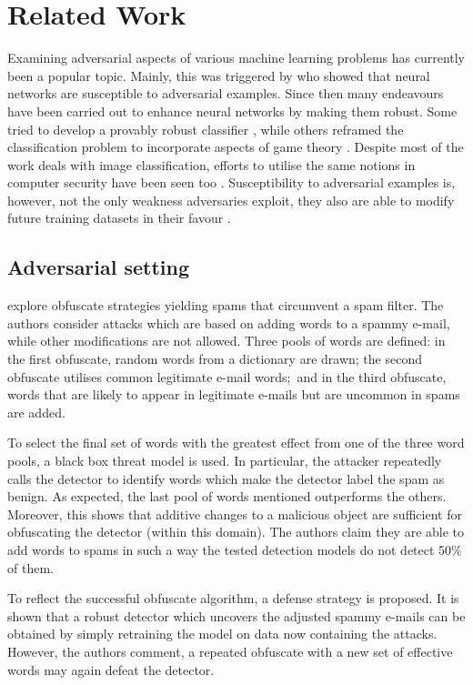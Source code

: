 \section{Related Work}

Examining adversarial aspects of various machine learning problems has
currently been a popular topic. Mainly, this was triggered by
\cite{adversarial_examples} who showed that neural networks are susceptible to
adversarial examples. Since then many endeavours have been carried out
to enhance neural networks by making them robust. Some tried to develop
a provably robust classifier \cite{provable_defenses}, while others reframed the
classification problem to incorporate aspects of game theory
\cite{stackelberg_games}. Despite most of the work deals with image
classification, efforts to utilise the same notions in computer security
have been seen too \cite{adversarial_malware_pe}. Susceptibility to adversarial
examples is, however, not the only weakness adversaries exploit, they
also are able to modify future training datasets in their favour
\cite{antidote}.

\subsection{Adversarial setting}

\cite{good_word_attacks} explore obfuscate strategies yielding spams that
circumvent a spam filter. The authors consider attacks which are based
on adding words to a spammy e-mail, while other modifications are not
allowed. Three pools of words are defined: in the first obfuscate,
random words from a dictionary are drawn; the second obfuscate utilises
common legitimate e-mail words;~and in the third obfuscate, words that
are likely to appear in legitimate e-mails but are uncommon in spams are
added.

To select the final set of words with the greatest effect from one of
the three word pools, a black box threat model is used. In particular,
the attacker repeatedly calls the detector to identify words which make
the detector label the spam as benign. As expected, the last pool of
words mentioned outperforms the others. Moreover, this shows that
additive changes to a malicious object are sufficient for obfuscating
the detector (within this domain). The authors claim they are able to
add words to spams in such a way the tested detection models do not
detect 50\% of them.

To reflect the successful obfuscate algorithm, a defense strategy is
proposed. It is shown that a robust detector which uncovers the adjusted
spammy e-mails can be obtained by simply retraining the model on data
now containing the attacks. However, the authors comment, a repeated
obfuscate with a new set of effective words may again defeat the
detector.

